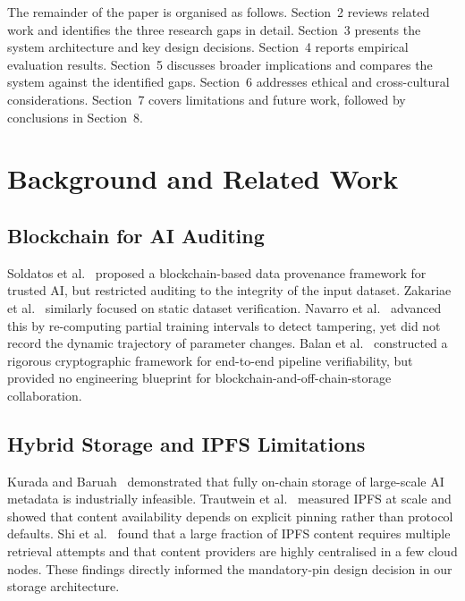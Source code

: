 \documentclass[10pt,twocolumn]{article}
\begin{document}
The remainder of the paper is organised as follows. Section~2 reviews related work and
identifies the three research gaps in detail. Section~3 presents the system architecture and
key design decisions. Section~4 reports empirical evaluation results. Section~5 discusses
broader implications and compares the system against the identified gaps. Section~6
addresses ethical and cross-cultural considerations. Section~7 covers limitations and
future work, followed by conclusions in Section~8.

\section{Background and Related Work}

\subsection{Blockchain for AI Auditing}

Soldatos et al.~\cite{soldatos2021} proposed a blockchain-based data provenance framework
for trusted AI, but restricted auditing to the integrity of the input dataset. Zakariae et
al.~\cite{zakariae2025} similarly focused on static dataset verification. Navarro et
al.~\cite{navarro2023} advanced this by re-computing partial training intervals to detect
tampering, yet did not record the dynamic trajectory of parameter changes. Balan et
al.~\cite{balan2025} constructed a rigorous cryptographic framework for end-to-end pipeline
verifiability, but provided no engineering blueprint for blockchain-and-off-chain-storage
collaboration.

\subsection{Hybrid Storage and IPFS Limitations}

Kurada and Baruah~\cite{kurada2023} demonstrated that fully on-chain storage of large-scale
AI metadata is industrially infeasible. Trautwein et al.~\cite{trautwein2022} measured IPFS
at scale and showed that content availability depends on explicit pinning rather than
protocol defaults. Shi et al.~\cite{shi2024} found that a large fraction of IPFS content
requires multiple retrieval attempts and that content providers are highly centralised in a
few cloud nodes. These findings directly informed the mandatory-pin design decision in
our storage architecture.
\end{document}
